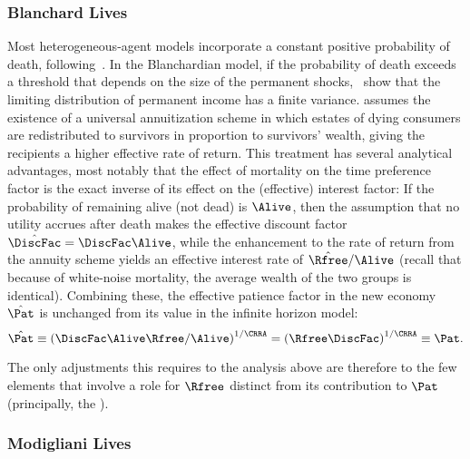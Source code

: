 \documentclass[ProjectDLO]{subfiles}
\begin{document}
\subsubsection{Blanchard Lives}
Most heterogeneous-agent models incorporate a constant positive probability of death, following~\cite{blanchardFinite}.  In the Blanchardian model, if the probability of death exceeds a threshold that depends on the size of the permanent shocks,~\cite{cstwMPC} show that the limiting distribution of permanent income has a finite variance.  \cite{blanchardFinite} assumes the existence of a universal annuitization scheme in which estates of dying consumers are redistributed to survivors in proportion to survivors' wealth, giving the recipients a higher effective rate of return. This treatment has several analytical advantages, most notably that the effect of mortality on the time preference factor is the exact inverse of its effect on the (effective) interest factor:  If the probability of remaining alive (not dead) is $\Alive$, then the assumption that no utility accrues after death makes the effective discount factor $\hat{\DiscFac}=\DiscFac\Alive$, while the enhancement to the rate of return from the annuity scheme yields an effective interest rate of $\hat{\Rfree}/\Alive$ (recall that because of white-noise mortality, the average wealth of the two groups is identical).  Combining these, the effective patience factor in the new economy $\hat{\Pat}$ is unchanged from its value in the infinite horizon model:%
\begin{equation}
  \hat{\Pat} \equiv {\left(\DiscFac \Alive \Rfree / \Alive\right)}^{1/\CRRA} = {\left(\Rfree \DiscFac\right)}^{1/\CRRA} \equiv \Pat.
\end{equation}

The only adjustments this requires to the analysis above are therefore to the few elements that involve a role for $\Rfree$ distinct from its contribution to $\Pat$ (principally, the {\RIC}).  %


\hypertarget{Modigliani-Lives}{}
\subsubsection{Modigliani Lives}
\end{document}
